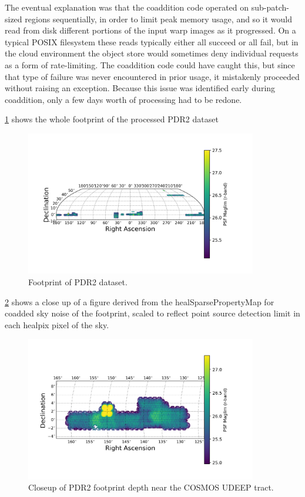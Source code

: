 The eventual explanation was that the coaddition code operated on sub-patch-sized regions
sequentially, in order to limit peak memory usage, and so it would read from disk different portions
of the input warp images as it progressed. On a typical POSIX filesystem these reads typically
either all succeed or all fail, but in the cloud environment the object store would sometimes deny
individual requests as a form of rate-limiting. The coaddition code could have caught this, but
since that type of failure was never encountered in prior usage, it mistakenly proceeded without
raising an exception. Because this issue was identified early during coaddition, only a few days
worth of processing had to be redone.










\ref{fig:footprint1} shows the whole footprint of the processed PDR2
dataset

 \begin{figure}[h]
 \includegraphics[width=0.9\textwidth]{r_maglim_pdr2.png}
	 \caption{Footprint of PDR2 dataset.  \label{fig:footprint1}}
 \end{figure}

 \ref{fig:footprint0} shows a close up of a figure derived from the healSparsePropertyMap for coadded sky noise of the footprint, scaled to reflect point
 source detection limit in each healpix pixel of the sky.

 \begin{figure}[h]
 \includegraphics[width=0.9\textwidth]{r-band-cosmos-pdr2.png}
	 \caption{Closeup of PDR2 footprint depth near the COSMOS UDEEP tract.  \label{fig:footprint0}}
 \end{figure}

